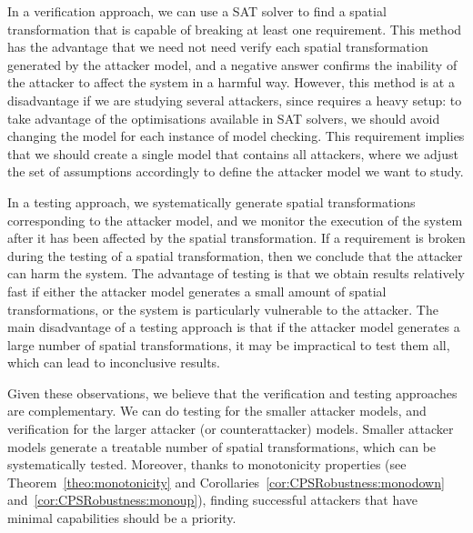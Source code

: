 In a verification approach, we can use a SAT solver to find a spatial transformation that is capable of breaking at least one requirement. This method has the advantage that we need not need verify each spatial transformation generated by the attacker model, and a negative answer confirms the inability of the attacker to affect the system in a harmful way. However, this method is at a disadvantage if we are studying several attackers, since requires a heavy setup: to take advantage of the optimisations available in SAT solvers, we should avoid changing the model for each instance of model checking. This requirement implies that we should create a single model that contains all attackers, where we adjust the set of assumptions accordingly to define the attacker model we want to study. 

In a testing approach, we systematically generate spatial transformations corresponding to the attacker model, and we monitor the execution of the system after it has been affected by the spatial transformation. If a requirement is broken during the testing of a spatial transformation, then we conclude that the attacker can harm the system. The advantage of testing is that we obtain results relatively fast if either the attacker model generates a small amount of spatial transformations, or the system is particularly vulnerable to the attacker. The main disadvantage of a testing approach is that if the attacker model generates a large number of spatial transformations, it may be impractical to test them all, which can lead to inconclusive results.

Given these observations, we believe that the verification and testing approaches are complementary. We can do testing for the smaller attacker models, and verification for the larger attacker (or counterattacker) models. Smaller attacker models generate a treatable number of spatial transformations, which can be systematically tested. Moreover, thanks to monotonicity properties (see Theorem~\ref{theo:monotonicity} and Corollaries~\ref{cor:CPSRobustness:monodown} and~\ref{cor:CPSRobustness:monoup}), finding successful attackers that have minimal capabilities should be a priority. %

